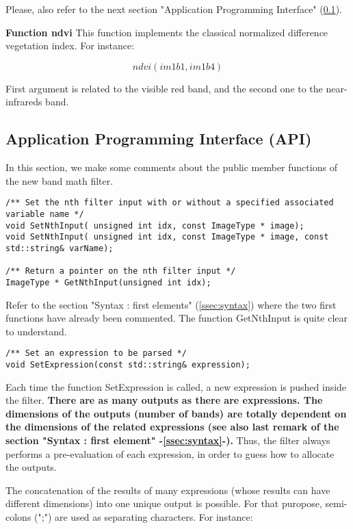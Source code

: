 Please, also refer to the next section "Application Programming Interface" (\ref{ssec:API}).

\textbf{Function ndvi} \newline
This function implements the classical normalized difference vegetation index. For instance:

\begin{equation}
	ndvi(im1b1,im1b4)
\end{equation}

First argument is related to the visible red band, and the second one to the near-infrareds band.

\subsection{Application Programming Interface (API)}\label{ssec:API}

In this section, we make some comments about the public member functions of the new band math filter.

\begin{verbatim}
/** Set the nth filter input with or without a specified associated variable name */
void SetNthInput( unsigned int idx, const ImageType * image);
void SetNthInput( unsigned int idx, const ImageType * image, const std::string& varName);

/** Return a pointer on the nth filter input */
ImageType * GetNthInput(unsigned int idx);
\end{verbatim}

Refer to the section "Syntax : first elements" (\ref{ssec:syntax}) where the two first functions have already been commented. The function GetNthInput is quite clear to understand.

\begin{verbatim}
/** Set an expression to be parsed */
void SetExpression(const std::string& expression);
\end{verbatim}

Each time the function  SetExpression is called, a new expression is pushed inside the filter. \textbf{There are as many outputs as there are expressions. The dimensions of the outputs (number of bands) are totally dependent on the dimensions of the related expressions (see also last remark of the section "Syntax : first element" -\ref{ssec:syntax}-).} Thus, the filter always performs a pre-evaluation of each expression, in order to guess how to allocate the outputs.

The concatenation of the results of many expressions (whose results can have different dimensions) into one unique output is possible. For that puropose, semi-colons (";") are used as separating characters. For instance:


